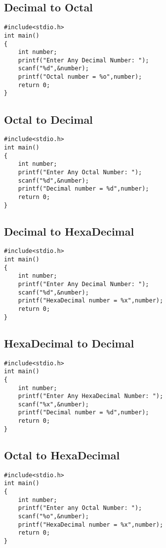 \documentclass[a4paper,14pt]{article}
\begin{document}
\subsection{Decimal to Octal}
\vspace{0.5cm}
\begin{lstlisting}[caption={Decimal to Octal}]
#include<stdio.h>
int main()
{
    int number;
    printf("Enter Any Decimal Number: ");
    scanf("%d",&number);
    printf("Octal number = %o",number);
    return 0;
}
\end{lstlisting}
\newpage

\subsection{Octal to Decimal}
\vspace{0.5cm}
\begin{lstlisting}[caption={Octal to Decimal}]
#include<stdio.h>
int main()
{
    int number;
    printf("Enter Any Octal Number: ");
    scanf("%d",&number);
    printf("Decimal number = %d",number);
    return 0;
}
\end{lstlisting}
\newpage

\subsection{Decimal to HexaDecimal}
\vspace{0.5cm}
\begin{lstlisting}[caption={Decimal to HexaDecimal}]
#include<stdio.h>
int main()
{
    int number;
    printf("Enter Any Decimal Number: ");
    scanf("%d",&number);
    printf("HexaDecimal number = %x",number);
    return 0;
}
\end{lstlisting}
\newpage

\subsection{HexaDecimal to Decimal}
\vspace{0.5cm}
\begin{lstlisting}[caption={HexaDecimal to Decimal}]
#include<stdio.h>
int main()
{
    int number;
    printf("Enter Any HexaDecimal Number: ");
    scanf("%x",&number);
    printf("Decimal number = %d",number);
    return 0;
}
\end{lstlisting}
\newpage

\subsection{Octal to HexaDecimal}
\vspace{0.5cm}
\begin{lstlisting}[caption={Octal to HexaDecimal}]
#include<stdio.h>
int main()
{
    int number;
    printf("Enter any Octal Number: ");
    scanf("%o",&number);
    printf("HexaDecimal number = %x",number);
    return 0;
}
\end{lstlisting}
\newpage
\end{document}
